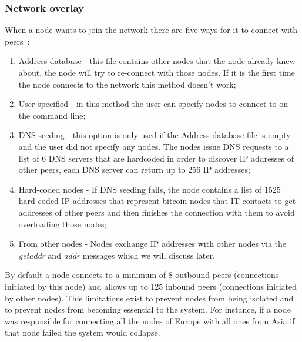 \subsubsection*{Network overlay}
\label{sec:p2pnetwork}

When a node wants to join the network there are five ways for it to connect with peers~\cite{bitcoinwiki}:

\begin{enumerate}
	\item Address database - this file contains other nodes that the node already knew about, the node will try to re-connect with those nodes. If it is the first time the node connects to the network this method doesn't work;
	\item User-specified - in this method the user can specify nodes to connect to on the command line;
	\item DNS seeding - this option is only used if the Address database file is empty and the user did not specify any nodes. The nodes issue DNS requests to a list of 6 DNS servers that are hardcoded in order to discover IP addresses of other peers, each DNS server can return up to 256 IP addresses;
	\item Hard-coded nodes - If DNS seeding fails, the node contains a list of 1525 hard-coded IP addresses that represent bitcoin nodes that IT contacts to get addresses of other peers and then finishes the connection with them to avoid overloading those nodes;
	\item From other nodes - Nodes exchange IP addresses with other nodes via the \textit{getaddr} and \textit{addr} messages which we will discuss later.
\end{enumerate}

By default a node connects to a minimum of 8 outbound peers (connections initiated by this node) and allows up to 125 inbound peers (connections initiated by other nodes). This limitations exist to prevent nodes from being isolated and to prevent nodes from becoming essential to the system. For instance, if a node was responsible for connecting all the nodes of Europe with all ones from Asia if that node failed the system would collapse.


